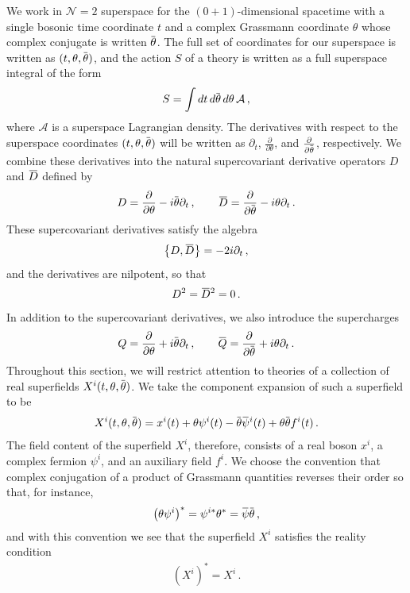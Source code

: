 \documentclass[12pt]{article}
\numberwithin{equation}{section}
\newcommand{\overbar}[1]{\mkern 1.5mu\overline{\mkern-1.5mu#1\mkern-1.5mu}\mkern 1.5mu}
\newcommand{\Dbar}{\overbar{D}}
\newcommand{\psib}{\overbar{\psi}}
\newcommand{\Qbar}{\overbar{Q}}
\newcommand{\thetab}{\overbar{\theta}}
\begin{document}
We work in $\mathcal{N} = 2$ superspace for the $(0+1)$-dimensional spacetime with a single bosonic time coordinate $t$ and a complex Grassmann coordinate $\theta$ whose complex conjugate is written $\overbar{\theta}$. The full set of coordinates for our superspace is written as $(t , \theta , \overbar{\theta} )$, and the action $S$ of a theory is written as a full superspace integral of the form
%
\begin{align}
    S = \int dt \, d \thetab \, d \theta \, \mathcal{A} \, , 
\end{align}
%
where $\mathcal{A}$ is a superspace Lagrangian density. The derivatives with respect to the superspace coordinates $(t, \theta, \overbar{\theta})$ will be written as $\partial_t$, $\frac{\partial}{\partial \theta}$, and $\frac{\partial}{\partial \thetab}$, respectively. We combine these derivatives into the natural supercovariant derivative operators $D$ and $\Dbar$ defined by
%
\begin{align}
    D = \frac{\partial}{\partial \theta} - i \thetab \partial_t \, , \qquad \Dbar = \frac{\partial}{\partial \thetab} - i \theta \partial_t \, .
\end{align}
%
These supercovariant derivatives satisfy the algebra
%
\begin{align}\label{susy_algebra}
    \left\{ D , \Dbar \right\} = - 2 i \partial_t \, , 
\end{align}
%
and the derivatives are nilpotent, so that
%
\begin{align}
    D^2 = \Dbar^2 = 0 \, .
\end{align}
%
In addition to the supercovariant derivatives, we also introduce the supercharges
%
\begin{align}
    Q = \frac{\partial}{\partial \theta} + i \thetab \partial_t \, , \qquad \Qbar = \frac{\partial}{\partial \thetab} + i \theta \partial_t \, .
\end{align}
%
Throughout this section, we will restrict attention to theories of a collection of real superfields $X^i ( t , \theta , \thetab )$. We take the component expansion of such a superfield to be
%
\begin{align}
    X^i ( t, \theta , \thetab ) = x^i ( t ) + \theta \psi^i ( t ) - \thetab \psib^i ( t ) + \theta \thetab f^i ( t ) \, .
\end{align}
%
The field content of the superfield $X^i$, therefore, consists of a real boson $x^i$, a complex fermion $\psi^i$, and an auxiliary field $f^i$. We choose the convention that complex conjugation of a product of Grassmann quantities reverses their order so that, for instance,
%
\begin{align}
    \left( \theta \psi^i \right)^\ast = \psi^{i \ast} \theta^\ast = \psib \thetab \, , 
\end{align}
%
and with this convention we see that the superfield $X^i$ satisfies the reality condition
%
\begin{align}
    \left( X^i \right)^\ast = X^i \, .
\end{align}
\end{document}
